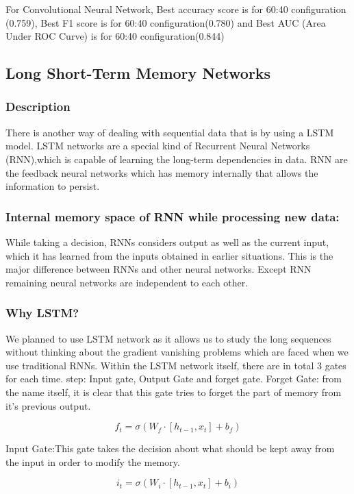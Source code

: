 \documentclass{article}
\begin{document}
For Convolutional Neural Network,
Best accuracy score is for 60:40 configuration (0.759),
Best F1 score is for 60:40 configuration(0.780) and
Best AUC (Area Under ROC Curve) is for 60:40 configuration(0.844)
\newpage
\subsection{Long Short-Term Memory Networks}
\subsubsection{Description}
There is another way of dealing with sequential data that is by using a LSTM model. LSTM networks are a special kind of Recurrent Neural Networks (RNN),which is capable of learning the long-term dependencies in data. RNN are the feedback neural networks which has memory internally that allows the information to persist.
\subsubsection{Internal memory space of RNN while processing new data:}
While taking a decision, RNNs considers output as well as the current input, which it has learned from the inputs obtained in earlier situations. This is the major difference between RNNs and other neural networks. Except RNN remaining neural networks are independent to each other.
\subsubsection{Why LSTM?}

We planned to use LSTM network as it allows us to study the long sequences without thinking about the gradient vanishing problems which are faced when we use traditional RNNs. Within the LSTM network itself, there are in total 3 gates for each time. step:  Input gate, Output Gate and forget gate. Forget Gate: from the name itself, it is clear that this gate tries to forget the part of  memory from it's previous output.


\begin{equation}
    \label{eq-add}
f_{t}=\sigma\left(W_{f} \cdot\left[h_{t-1}, x_{t}\right]+b_{f}\right)
\end{equation}
\bigskip


Input Gate:This gate takes the decision about what should be kept away from the input in order to modify the memory. 

\begin{equation}
    \label{eq-add}
i_{t}=\sigma\left(W_{i} \cdot\left[h_{t-1}, x_{t}\right]+b_{i}\right)
\end{equation}
\bigskip
\end{document}
